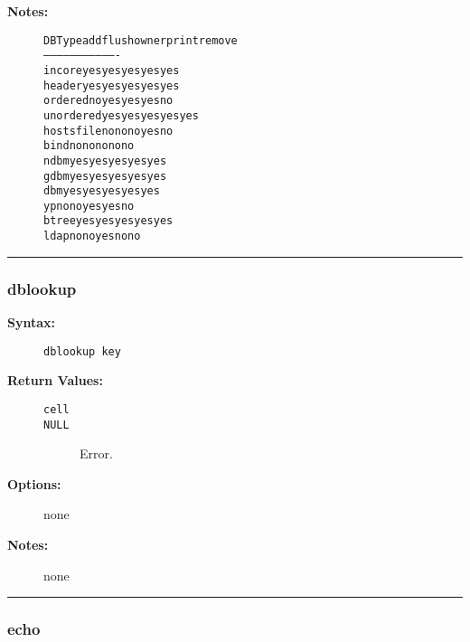 \begin{description}
\begin{description}
\end{description}


\item[{\bf Notes:}] \mbox{}

\begin{alltt}
DBType    add flush owner print remove
------    ----------------------------
incore    yes yes   yes   yes   yes
header    yes yes   yes   yes   yes
ordered   no  yes   yes   yes   no
unordered yes yes   yes   yes   yes
hostsfile no  no    no    yes   no
bind      no  no    no    no    no
ndbm      yes yes   yes   yes   yes
gdbm      yes yes   yes   yes   yes
dbm       yes yes   yes   yes   yes
yp        no  no    yes   yes   no
btree     yes yes   yes   yes   yes
ldap      no  no    yes   no    no
\end{alltt}


\end{description}


\hrule
\subsubsection{dblookup}

\begin{description}
\item[{\bf Syntax:}] \mbox{}

{\tt dblookup key}

\item[{\bf Return Values:}] \mbox{}

\begin{description}
\item[{\tt cell}] \mbox{}



\item[{\tt NULL}] \mbox{}

Error.  

\end{description}


\item[{\bf Options:}] \mbox{}

none

\item[{\bf Notes:}] \mbox{}

none

\end{description}


\hrule
\subsubsection{echo}

